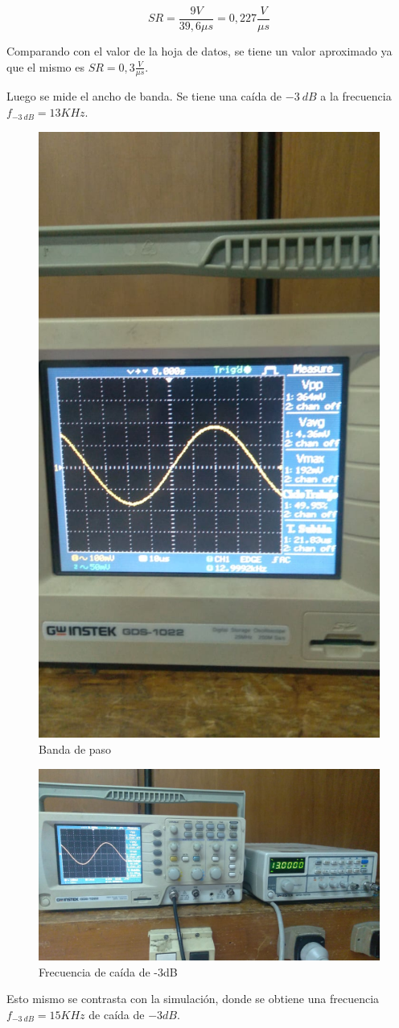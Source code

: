 \[SR= \frac{9V}{39,6\mu s}= 0,227\frac{V}{\mu s}\]

Comparando con el valor de la hoja de datos, se tiene un valor aproximado ya que el mismo es \(SR= 0,3 \frac{V}{\mu s}\).

Luego se mide el ancho de banda. Se tiene una caída de \(-3~dB\) a la frecuencia \(f_{-3~dB}= 13KHz\).
\begin{figure}[H]
    \centering
    \includegraphics[width=0.8\linewidth]{img/Banda de paso.jpeg}
    \caption{Banda de paso}
    
\end{figure}
\begin{figure}[H]
    \centering
    \includegraphics[width=0.8\linewidth]{img/Ancho de banda.jpeg}
    \caption{Frecuencia de caída de -3dB}
    
\end{figure}

Esto mismo se contrasta con la simulación, donde se obtiene una frecuencia \(f_{-3~dB}= 15KHz\) de caída de \(-3dB\).